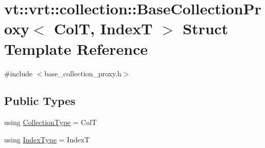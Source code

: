 \hypertarget{structvt_1_1vrt_1_1collection_1_1_base_collection_proxy}{}\section{vt\+:\+:vrt\+:\+:collection\+:\+:Base\+Collection\+Proxy$<$ ColT, IndexT $>$ Struct Template Reference}
\label{structvt_1_1vrt_1_1collection_1_1_base_collection_proxy}


{\ttfamily \#include $<$base\+\_\+collection\+\_\+proxy.\+h$>$}

\subsection*{Public Types}
\begin{DoxyCompactItemize}
\item 
using \hyperlink{structvt_1_1vrt_1_1collection_1_1_base_collection_proxy_ad4bbb4f404335a60173142bf0856fbf8}{Collection\+Type} = ColT
\item 
using \hyperlink{structvt_1_1vrt_1_1collection_1_1_base_collection_proxy_a271532c5b15765fad6d172f9cfc097a6}{Index\+Type} = IndexT
\end{DoxyCompactItemize}
